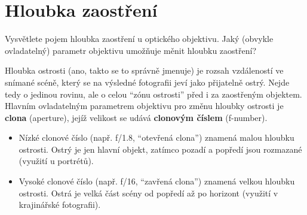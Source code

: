 \section{Hloubka zaostření}
Vysvětlete pojem hloubka zaostření u optického objektivu. Jaký (obvykle ovladatelný) parametr objektivu umožňuje měnit 
hloubku zaostření?

Hloubka ostrosti (ano, takto se to správně jmenuje) je rozsah vzdáleností ve snímané scéně, který se na výsledné 
fotografii jeví jako přijatelně ostrý. Nejde tedy o jedinou rovinu, ale o celou \enquote{zónu ostrosti} před i za 
zaostřeným objektem. Hlavním ovladatelným parametrem objektivu pro změnu hloubky ostrosti je \textbf{clona} (aperture), 
jejíž velikost se udává \textbf{clonovým číslem} (f-number).
\begin{itemize}
    \item Nízké clonové číslo (např. f/1.8, \enquote{otevřená clona}) znamená malou hloubku ostrosti. Ostrý je jen 
    hlavní objekt, zatímco pozadí a popředí jsou rozmazané (využití u portrétů).
    \item Vysoké clonové číslo (např. f/16, \enquote{zavřená clona}) znamená velkou hloubku ostrosti. Ostrá je velká 
    část scény od popředí až po horizont (využití v krajinářské fotografii).
\end{itemize}